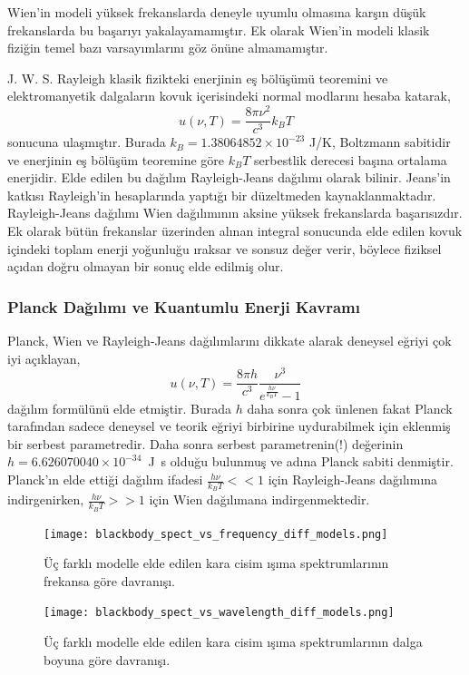 \documentclass[a4paper,12pt, twoside]{article}
\begin{document}
Wien'in modeli yüksek frekanslarda deneyle uyumlu olmasına karşın düşük frekanslarda bu başarıyı yakalayamamıştır. Ek olarak Wien'in modeli klasik fiziğin temel bazı varsayımlarını göz önüne almamamıştır. 

J. W. S. Rayleigh klasik fizikteki enerjinin eş bölüşümü teoremini ve elektromanyetik dalgaların kovuk içerisindeki normal modlarını hesaba katarak,
%
\begin{equation}
\label{eq:Rayleigh}
u(\nu, T) = \frac{8 \pi \nu^{2}}{c^{3}} k_{B} T
\end{equation}
sonucuna ulaşmıştır. Burada $k_B = 1.38064852 \times 10^{-23}$ J/K, Boltzmann sabitidir ve enerjinin eş bölüşüm teoremine göre $k_B T$ serbestlik derecesi başına ortalama enerjidir. Elde edilen bu dağılım Rayleigh-Jeans dağılımı olarak bilinir. Jeans'in katkısı Rayleigh'in hesaplarında yaptığı bir düzeltmeden kaynaklanmaktadır. Rayleigh-Jeans dağılımı Wien dağılımının aksine yüksek frekanslarda başarısızdır. Ek olarak bütün frekanslar üzerinden alınan integral sonucunda elde edilen kovuk içindeki toplam enerji yoğunluğu ıraksar ve sonsuz değer verir, böylece fiziksel açıdan doğru olmayan bir sonuç elde edilmiş olur.






\subsubsection{Planck Dağılımı ve Kuantumlu Enerji Kavramı}

Planck, Wien ve Rayleigh-Jeans dağılımlarını dikkate alarak deneysel eğriyi çok iyi açıklayan,
\begin{equation}
\label{eq:Planck}
u(\nu, T) = \frac{8 \pi h}{c^{3}} \frac{\nu^{3}}{e^{\frac{h \nu}{k_{B} T}} - 1}
\end{equation} 
dağılım formülünü elde etmiştir. Burada $h$ daha sonra çok ünlenen fakat Planck tarafından sadece deneysel ve teorik eğriyi birbirine uydurabilmek için eklenmiş bir serbest parametredir. Daha sonra serbest parametrenin(!) değerinin $h=6.626070040 \times 10^{-34}$~J~s olduğu bulunmuş ve adına Planck sabiti denmiştir. Planck'ın elde ettiği dağılım ifadesi $\frac{h\nu}{k_B T}<<1$ için Rayleigh-Jeans dağılımına indirgenirken, $\frac{h\nu}{k_B T}>>1$ için Wien dağılımana indirgenmektedir.

\begin{figure}[hbtp]
\begin{minipage}{0.49\textwidth}
\center
\texttt{[image: blackbody\_spect\_vs\_frequency\_diff\_models.png]}
\caption{Üç farklı modelle elde edilen kara cisim ışıma spektrumlarının frekansa göre davranışı.}
\label{fig:karaSpektrum_nu}
\end{minipage}
\hspace{12pt}
\begin{minipage}{0.49\textwidth}
\center
\texttt{[image: blackbody\_spect\_vs\_wavelength\_diff\_models.png]}
\caption{Üç farklı modelle elde edilen kara cisim ışıma spektrumlarının dalga boyuna göre davranışı.}
\label{fig:karaSpektrum_lambda}
\end{minipage}
\end{figure}
\end{document}
